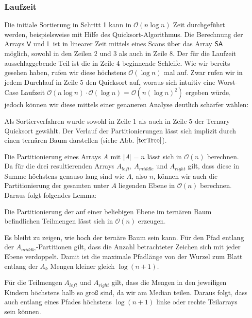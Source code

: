\subsubsection{Laufzeit}
Die initiale Sortierung in Schritt 1 kann in $\mathcal{O}(n\log n)$ Zeit durchgeführt werden, beispielsweise mit Hilfe des Quicksort-Algorithmus. Die Berechnung der Arrays $\mathsf{V}$ und $\mathsf{L}$ ist in linearer Zeit mittels eines Scans über das Array $\sa$ möglich, sowohl in den Zeilen 2 und 3 als auch in Zeile 8. Der für die Laufzeit ausschlaggebende Teil ist die in Zeile 4 beginnende Schleife. Wie wir bereits gesehen haben, rufen wir diese höchstens $\mathcal{O}(\log n)$ mal auf. Zwar rufen wir in jedem Durchlauf in Zeile 5 den Quicksort auf, woraus sich intuitiv eine Worst-Case Laufzeit $\mathcal{O}(n\log  n)\cdot \mathcal{O}(\log n)$ = $\mathcal{O}(n(\log n)^2)$ ergeben würde, jedoch können wir diese mittels einer genaueren Analyse deutlich schärfer wählen:

Als Sortierverfahren wurde sowohl in Zeile 1 als auch in Zeile 5 der Ternary Quicksort gewählt. Der Verlauf der Partitionierungen lässt sich implizit durch einen ternären Baum darstellen (siehe Abb. $\ref{terTree}$).

Die Partitionierung eines Arrays $A$ mit $|A|=n$ lässt sich in $\mathcal{O}(n)$ berechnen. Da für die drei resultierenden Arrays $A_{left}$, $A_{middle}$ und $A_{right}$ gilt, dass diese in Summe höchstens genauso lang sind wie $A$, also $n$, können wir auch die Partitionierung der gesamten unter $A$ liegenden Ebene in $\mathcal{O}(n)$ berechnen. Daraus folgt folgendes Lemma:
\begin{lemma}
Die Partitionierung der auf einer beliebigen Ebene im ternären Baum befindlichen Teilmengen lässt sich in $\mathcal{O}(n)$ erzeugen. 
\end{lemma}
Es bleibt zu zeigen, wie hoch der ternäre Baum sein kann. Für den Pfad entlang der $A_{middle}$-Partitionen gilt, dass die Anzahl betrachteter Zeichen sich mit jeder Ebene verdoppelt. Damit ist die maximale Pfadlänge von der Wurzel zum Blatt entlang der $A_k$ Mengen kleiner gleich $ \log (n+1)$.

Für die Teilmengen $A_{left}$ und $A_{right}$ gilt, dass die Mengen in den jeweiligen Kindern höchstens halb so groß sind, da wir am Median teilen. Daraus folgt, dass auch entlang eines Pfades höchstens $\log (n+1)$ linke oder rechte Teilarrays sein können.

